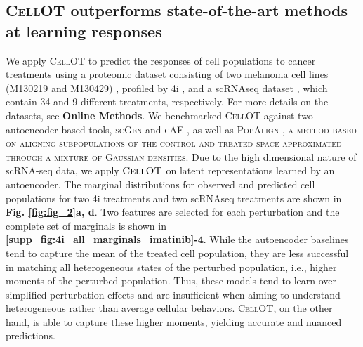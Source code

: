 \subsection{\textsc{CellOT} outperforms state-of-the-art methods at learning responses}

We apply \textsc{CellOT} to predict the responses of cell populations to cancer treatments using a proteomic dataset consisting of two melanoma cell lines (M130219 and M130429) \cite{raaijmakers2015new}, profiled by 4i \cite{gut2018multiplexed}, and a scRNAseq dataset \cite{srivatsan2020massively}, which contain 34 and 9 different treatments, respectively.
For more details on the datasets, see \textbf{Online Methods}.
We benchmarked \textsc{CellOT} against two autoencoder-based tools, \textsc{scGen} \cite{lotfollahi2019scgen} and \textsc{cAE} \cite{Lopez2018scvi}, as well as \textsc{PopAlign \cite{chen2020dissecting}, a method based on aligning subpopulations of the control and treated space approximated through a mixture of Gaussian densities.}
Due to the high dimensional nature of scRNA-seq data, we apply $\textsc{CellOT}$ on latent representations learned by an autoencoder.
The marginal distributions for observed and predicted cell populations for two 4i treatments and two scRNAseq treatments are shown in \textbf{Fig. \ref{fig:fig_2}a, d}. 
Two features are selected for each perturbation and the complete set of marginals is shown in \textbf{\ref{supp_fig:4i_all_marginals_imatinib}-4}.
While the autoencoder baselines tend to capture the mean of the treated cell population, they are less successful in matching all heterogeneous states of the perturbed population, i.e., higher moments of the perturbed population.
Thus, these models tend to learn over-simplified perturbation effects and are insufficient when aiming to understand heterogeneous rather than average cellular behaviors.
\textsc{CellOT}, on the other hand, is able to capture these higher moments, yielding accurate and nuanced predictions.

